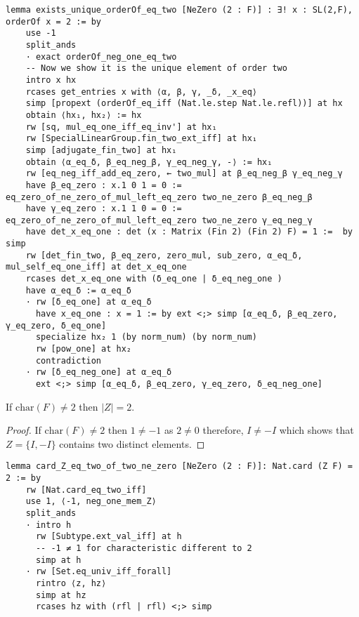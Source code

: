 \begin{footnotesize}
\begin{verbatim}
lemma exists_unique_orderOf_eq_two [NeZero (2 : F)] : ∃! x : SL(2,F), orderOf x = 2 := by
    use -1
    split_ands
    · exact orderOf_neg_one_eq_two
    -- Now we show it is the unique element of order two
    intro x hx
    rcases get_entries x with ⟨α, β, γ, _δ, _x_eq⟩
    simp [propext (orderOf_eq_iff (Nat.le.step Nat.le.refl))] at hx
    obtain ⟨hx₁, hx₂⟩ := hx
    rw [sq, mul_eq_one_iff_eq_inv'] at hx₁
    rw [SpecialLinearGroup.fin_two_ext_iff] at hx₁
    simp [adjugate_fin_two] at hx₁
    obtain ⟨α_eq_δ, β_eq_neg_β, γ_eq_neg_γ, -⟩ := hx₁
    rw [eq_neg_iff_add_eq_zero, ← two_mul] at β_eq_neg_β γ_eq_neg_γ
    have β_eq_zero : x.1 0 1 = 0 := eq_zero_of_ne_zero_of_mul_left_eq_zero two_ne_zero β_eq_neg_β
    have γ_eq_zero : x.1 1 0 = 0 := eq_zero_of_ne_zero_of_mul_left_eq_zero two_ne_zero γ_eq_neg_γ
    have det_x_eq_one : det (x : Matrix (Fin 2) (Fin 2) F) = 1 :=  by simp
    rw [det_fin_two, β_eq_zero, zero_mul, sub_zero, α_eq_δ, mul_self_eq_one_iff] at det_x_eq_one
    rcases det_x_eq_one with (δ_eq_one | δ_eq_neg_one )
    have α_eq_δ := α_eq_δ
    · rw [δ_eq_one] at α_eq_δ
      have x_eq_one : x = 1 := by ext <;> simp [α_eq_δ, β_eq_zero, γ_eq_zero, δ_eq_one]
      specialize hx₂ 1 (by norm_num) (by norm_num)
      rw [pow_one] at hx₂
      contradiction
    · rw [δ_eq_neg_one] at α_eq_δ
      ext <;> simp [α_eq_δ, β_eq_zero, γ_eq_zero, δ_eq_neg_one]
\end{verbatim}
\end{footnotesize}

\begin{lemma}
    \label{SpecialSubgroups.card_Z_eq_two_of_two_ne_zero}
    \leanok
    If $\textrm{char}(F) \ne 2$ then $|Z| = 2$.
\end{lemma}
\begin{proof}
\leanok
    If $\textrm{char}(F) \ne 2$ then $1 \ne -1$ as $2 \ne 0$ therefore, $I \ne -I$ which shows that $Z = \{I , -I\}$ contains two distinct elements.
\end{proof}
\begin{footnotesize}
\begin{verbatim}
lemma card_Z_eq_two_of_two_ne_zero [NeZero (2 : F)]: Nat.card (Z F) = 2 := by
    rw [Nat.card_eq_two_iff]
    use 1, ⟨-1, neg_one_mem_Z⟩
    split_ands
    · intro h
      rw [Subtype.ext_val_iff] at h
      -- -1 ≠ 1 for characteristic different to 2
      simp at h
    · rw [Set.eq_univ_iff_forall]
      rintro ⟨z, hz⟩
      simp at hz
      rcases hz with (rfl | rfl) <;> simp
\end{verbatim}
\end{footnotesize}

